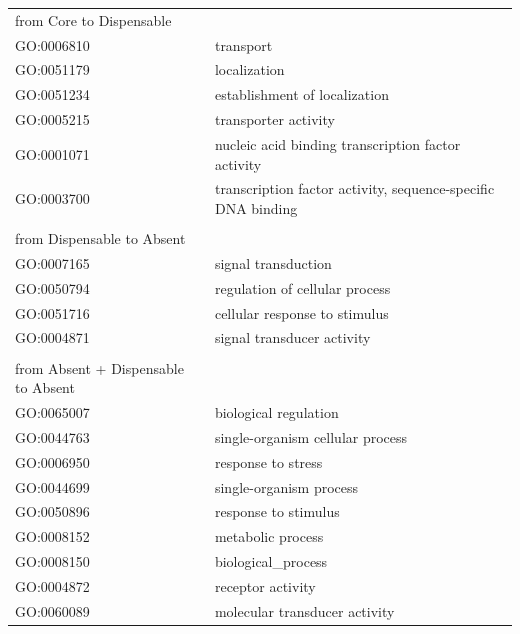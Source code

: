 \documentclass[10pt,letterpaper]{article}
\begin{document}
\begin{table}[]
\centering
\begin{tabular}{ll}
from Core to Dispensable    &                                             \\
GO:0006810     & transport                                   \\
GO:0051179     & localization                                \\
GO:0051234     & establishment of localization               \\
GO:0005215     & transporter activity                        \\
GO:0001071     & nucleic acid binding transcription factor activity \\
GO:0003700     & transcription factor activity, sequence-specific DNA binding \\
               &                                             \\
from Dispensable to Absent     &                                             \\
GO:0007165     & signal transduction                         \\
GO:0050794     & regulation of cellular process              \\
GO:0051716     & cellular response to stimulus               \\
GO:0004871     & signal transducer activity                  \\
               &                                             \\
from Absent + Dispensable to Absent &                                             \\
GO:0065007     & biological regulation                       \\
GO:0044763     & single-organism cellular process            \\
GO:0006950     & response to stress                          \\
GO:0044699     & single-organism process                     \\
GO:0050896     & response to stimulus                        \\
GO:0008152     & metabolic process                           \\
GO:0008150     & biological\_process                         \\
GO:0004872     & receptor activity                           \\
GO:0060089     & molecular transducer activity               \\

\end{tabular}
\end{table}
\end{document}
